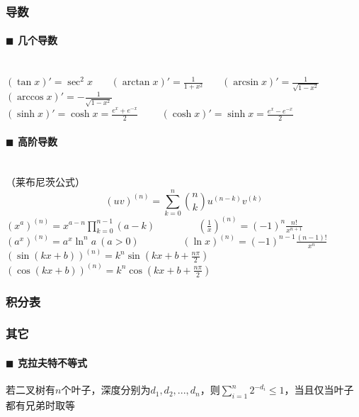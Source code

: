 \subsubsection{导数}
\paragraph{$\blacksquare$ 几个导数}
\noindent \\
$(\tan x)'=\sec ^2 x$~~~
$(\arctan x)'=\frac{1}{1+x^2}$~~~
$(\arcsin x)'=\frac{1}{\sqrt{1-x^2}}$~~~
$(\arccos x)'=-\frac{1}{\sqrt{1-x^2}}$\\
$(\sinh x)'=\cosh x=\frac{e^x+e^{-x}}{2}$~~~~
$(\cosh x)'=\sinh x=\frac{e^x-e^{-x}}{2}$
\paragraph{$\blacksquare$ 高阶导数}
\noindent \\
（莱布尼茨公式）
$$(uv)^{(n)}=\sum _{{k=0}}^{n}{\binom{n}{k} u^{(n-k)} v^{(k)}}$$
${\displaystyle (x^a)^{(n)}=x^{a-n} \prod _{{k=0}}^{{n-1}} (a-k)}$~~~~~~~~
$(\frac{1}{x})^{(n)}=(-1)^n\frac{n!}{x^{n+1}}$\\
$(a^x)^{(n)}=a^x \ln ^n a~(a>0)$~~~~~~~~
$(\ln x)^{(n)}=(-1)^{n-1} \frac{(n-1)!}{x^n}$\\
$(\sin (kx+b))^{(n)}=k^n \sin (kx+b+\frac{n\pi}{2})$~~~~
$(\cos (kx+b))^{(n)}=k^n \cos (kx+b+\frac{n\pi}{2})$

\subsubsection{积分表}


\subsubsection{其它}
\paragraph{$\blacksquare$ 克拉夫特不等式}
若二叉树有$n$个叶子，深度分别为$d_1, d_2, ... ,d_n$，则${\displaystyle \sum _{i=1}^{n} 2^{-d_i} \leq 1}$，当且仅当叶子都有兄弟时取等

